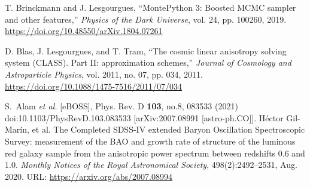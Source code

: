 \begin{thebibliography}{999}


T. Brinckmann and J. Lesgourgues, ``MontePython 3: Boosted MCMC sampler and other features,'' \textit{Physics of the Dark Universe}, vol. 24, pp. 100260, 2019. \url{https://doi.org/10.48550/arXiv.1804.07261}

D. Blas, J. Lesgourgues, and T. Tram, ``The cosmic linear anisotropy solving system (CLASS). Part II: approximation schemes,'' \textit{Journal of Cosmology and Astroparticle Physics}, vol. 2011, no. 07, pp. 034, 2011. \url{https://doi.org/10.1088/1475-7516/2011/07/034}%

S.~Alam \textit{et al.} [eBOSS],
Phys. Rev. D \textbf{103}, no.8, 083533 (2021)
doi:10.1103/PhysRevD.103.083533
[arXiv:2007.08991 [astro-ph.CO]].
Héctor Gil-Marín, et al.
\newblock The Completed {SDSS}-{IV} extended Baryon Oscillation Spectroscopic Survey: measurement of the {BAO} and growth rate of structure of the luminous red galaxy sample from the anisotropic power spectrum between redshifts 0.6 and 1.0.
\newblock \emph{Monthly Notices of the Royal Astronomical Society}, 498(2):2492--2531, Aug. 2020.
\newblock URL: \url{https://arxiv.org/abs/2007.08994}





\end{thebibliography}
